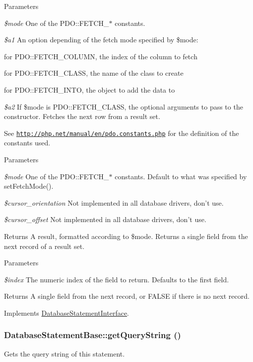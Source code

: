 \begin{DoxyParams}{Parameters}
\item[{\em \$mode}]One of the PDO::FETCH\_\-$\ast$ constants. \item[{\em \$a1}]An option depending of the fetch mode specified by \$mode:
\begin{DoxyItemize}
\item for PDO::FETCH\_\-COLUMN, the index of the column to fetch
\item for PDO::FETCH\_\-CLASS, the name of the class to create
\item for PDO::FETCH\_\-INTO, the object to add the data to 
\end{DoxyItemize}\item[{\em \$a2}]If \$mode is PDO::FETCH\_\-CLASS, the optional arguments to pass to the constructor. Fetches the next row from a result set.\end{DoxyParams}
See \href{http://php.net/manual/en/pdo.constants.php}{\tt http://php.net/manual/en/pdo.constants.php} for the definition of the constants used.


\begin{DoxyParams}{Parameters}
\item[{\em \$mode}]One of the PDO::FETCH\_\-$\ast$ constants. Default to what was specified by setFetchMode(). \item[{\em \$cursor\_\-orientation}]Not implemented in all database drivers, don't use. \item[{\em \$cursor\_\-offset}]Not implemented in all database drivers, don't use.\end{DoxyParams}
\begin{DoxyReturn}{Returns}
A result, formatted according to \$mode. Returns a single field from the next record of a result set.
\end{DoxyReturn}

\begin{DoxyParams}{Parameters}
\item[{\em \$index}]The numeric index of the field to return. Defaults to the first field.\end{DoxyParams}
\begin{DoxyReturn}{Returns}
A single field from the next record, or FALSE if there is no next record. 
\end{DoxyReturn}


Implements \hyperlink{interfaceDatabaseStatementInterface_a66325e9222c90de0fc87c201652be9e4}{DatabaseStatementInterface}.\hypertarget{classDatabaseStatementBase_afc56564e99ad8fe9c8c2549f77c37b3c}{
\subsubsection[{getQueryString}]{\setlength{\rightskip}{0pt plus 5cm}DatabaseStatementBase::getQueryString ()}}
\label{classDatabaseStatementBase_afc56564e99ad8fe9c8c2549f77c37b3c}
Gets the query string of this statement.

